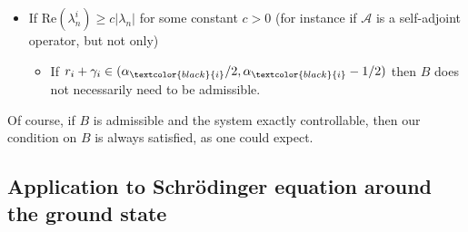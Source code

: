 \documentclass[11pt, dvipsnames]{amsart}
\begin{document}
\begin{itemize}
\noindent \textcolor{black}{Note that both $r_{i}\in(1/2-\alpha_i+\gamma_{i},0)$ and $r_{i}+\gamma_{i}\in(0,\alpha_{i}-1/2)$ can be satisfied at the same time. As a consequence, our sufficient condition for rapid stabilization \eqref{eq:condbsup} can hold even in cases where the system is \textbf{not} exactly controllable in \textcolor{black}{the state space $X$} \textbf{and} $B$ is not admissible.}\\

\item If $\text{Re}(\lambda_{n}^{i})\geq c |\lambda_{n}|$ for some constant $c>0$ (for instance if $\mathcal{A}$ is a self-adjoint operator, but not only)
\begin{itemize}
\item If $r_{i}+\gamma_{i}\in(\alpha_{\textcolor{black}{i}}/2,\alpha_{\textcolor{black}{i}}-1/2)$ then 
$B$ does not necessarily need to be admissible.
\end{itemize}
\end{itemize}

Of course, if $B$ is admissible and the system exactly controllable, then our condition on $B$ is always satisfied, as one could expect.

\subsection{Application to Schrödinger equation around the ground state}
\label{sec:schro}
\end{document}
